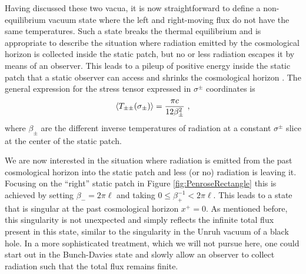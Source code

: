 \documentclass[a4paper,11pt]{article}
\newcommand{\beq}{\begin{equation}}
\newcommand{\eeq}{\end{equation}}
\numberwithin{equation}{section}
\begin{document}
Having discussed these two vacua, it is now straightforward to define a non-equilibrium vacuum state where the left and right-moving flux do not have the same temperatures. Such a state breaks the thermal equilibrium and is appropriate to describe the situation where radiation emitted by the cosmological horizon is collected inside the static patch, but no or less radiation escapes it by means of an observer. This leads to a pileup of positive energy inside the static patch that a static observer can access and shrinks the cosmological horizon \cite{Aalsma:2019rpt}. The general expression for the stress tensor expressed in $\sigma^\pm$ coordinates is
\beq
\braket{T_{\pm\pm}(\sigma_\pm)} = \frac{\pi c}{12\beta^{2}_\pm} ~,
\eeq
where $\beta_\pm$ are the different inverse temperatures of radiation at a constant $\sigma^\pm$ slice at the center of the static patch.

We are now interested in the situation where radiation is emitted from the past cosmological horizon into the static patch and less (or no) radiation is leaving it. Focusing on the ``right'' static patch in  Figure \ref{fig:PenroseRectangle} this is achieved by setting $\beta_-=2\pi\ell$ and taking $0\leq \beta_+^{-1} < 2\pi\ell$. This leads to a state that is singular at the past cosmological horizon $x^+=0$. As mentioned before, this singularity is not unexpected and simply reflects the infinite total flux present in this state, similar to the singularity in the Unruh vacuum of a black hole. In a more sophisticated treatment, which we will not pursue here, one could start out in the Bunch-Davies state and slowly allow an observer to collect radiation such that the total flux remains finite. 
\end{document}
